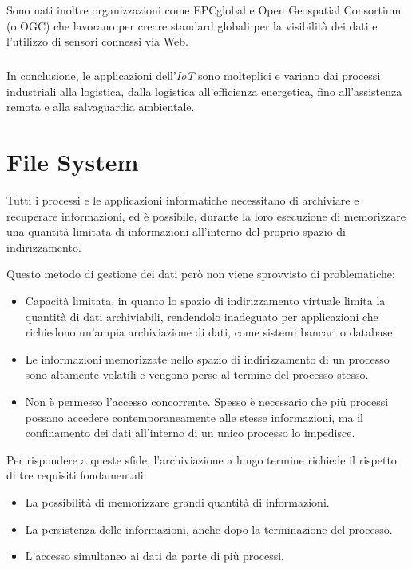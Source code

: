 \documentclass[12pt,a4paper,openright,twoside]{book}
\begin{document}
        Sono nati inoltre organizzazioni come EPCglobal e Open Geospatial Consortium (o OGC) che lavorano per creare standard globali per la visibilità dei dati e l’utilizzo di sensori connessi via Web.

        \subparagraph*{}

        In conclusione, le applicazioni dell’\textit{IoT} sono molteplici e variano dai processi industriali alla logistica, dalla logistica all’efficienza energetica, fino all’assistenza remota e alla salvaguardia ambientale.

        \cite{uckelmann2011architecting}\cite{hersent2011internet}\cite{chaouchi2013internet}

    \section{File System}

        Tutti i processi e le applicazioni informatiche necessitano di archiviare e recuperare informazioni, ed è possibile, durante la loro esecuzione di memorizzare una quantità limitata di informazioni all'interno del proprio spazio di indirizzamento.

        Questo metodo di gestione dei dati però non viene sprovvisto di problematiche:

        \begin{itemize}
            \item Capacità limitata, in quanto lo spazio di indirizzamento virtuale limita la quantità di dati archiviabili, rendendolo inadeguato per applicazioni che richiedono un'ampia archiviazione di dati, come sistemi bancari o database.
            \item Le informazioni memorizzate nello spazio di indirizzamento di un processo sono altamente volatili e vengono perse al termine del processo stesso.
            \item Non è permesso l'accesso concorrente. Spesso è necessario che più processi possano accedere contemporaneamente alle stesse informazioni, ma il confinamento dei dati all'interno di un unico processo lo impedisce.
        \end{itemize}

        \pagebreak

        Per rispondere a queste sfide, l'archiviazione a lungo termine richiede il rispetto di tre requisiti fondamentali:

        \begin{itemize}
            \item La possibilità di memorizzare grandi quantità di informazioni.
            \item La persistenza delle informazioni, anche dopo la terminazione del processo.
            \item L'accesso simultaneo ai dati da parte di più processi.
        \end{itemize}
\end{document}
